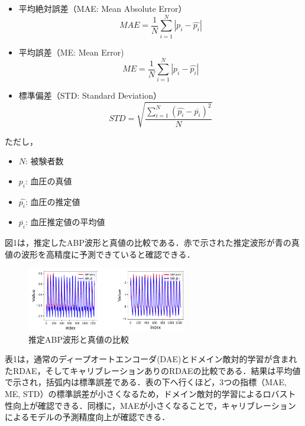 \documentclass[twocolumn, a4paper]{ieicejsp}
\begin{document}
{\begin{itemize}
  \item 平均絶対誤差（MAE: Mean Absolute Error）
  \begin{equation}
    MAE = \frac{1}{N} \sum_{i=1}^{N} |p_i - \hat{p_i}|
  \end{equation}
  \item 平均誤差（ME: Mean Error)
  \begin{equation}
    ME = \frac{1}{N} \sum_{i=1}^{N} |p_i - \hat{p_i}|
  \end{equation}
  \item 標準偏差（STD: Standard Deviation）
  \begin{equation}
    STD = \sqrt{\frac{\sum_{i=1}^{N} (\hat{p_i} - \overline{p_i})^2}{N}}
  \end{equation}
\end{itemize}
ただし，
\begin{itemize}
  \item $N$: 被験者数
  \item $p_i$: 血圧の真値
  \item $\hat{p_i}$: 血圧の推定値
  \item $\overline{p_i}$: 血圧推定値の平均値
\end{itemize}

図1は，推定したABP波形と真値の比較である．赤で示された推定波形が青の真値の波形を高精度に予測できていると確認できる．

\begin{figure}[H]
  \begin{center}
    \includegraphics[width=7cm]{./result_abpwave.png}
    \caption{\small 推定ABP波形と真値の比較}
  \end{center}
\end{figure}

表1は，通常のディープオートエンコーダ(DAE)とドメイン敵対的学習が含まれたRDAE，そしてキャリブレーションありのRDAEの比較である．結果は平均値で示され，括弧内は標準誤差である．表の下へ行くほど，3つの指標（MAE, ME, STD）の標準誤差が小さくなるため，ドメイン敵対的学習によるロバスト性向上が確認できる．同様に，MAEが小さくなることで，キャリブレーションによるモデルの予測精度向上が確認できる．

}
\end{document}
